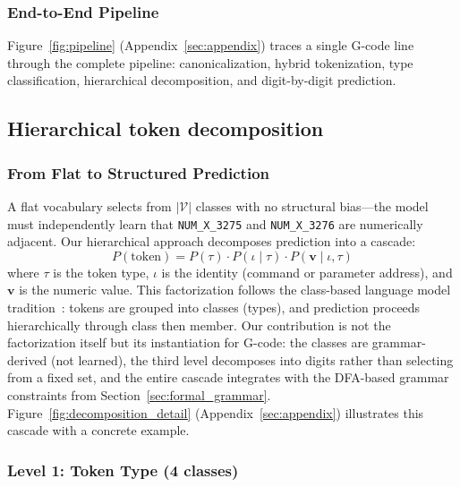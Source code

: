 \documentclass[11pt]{article}
\begin{document}
\subsubsection{End-to-End Pipeline}

Figure~\ref{fig:pipeline} (Appendix~\ref{sec:appendix}) traces a single G-code line through the complete pipeline: canonicalization, hybrid tokenization, type classification, hierarchical decomposition, and digit-by-digit prediction.

\subsection{Hierarchical token decomposition}
\label{sec:decomposition}

\subsubsection{From Flat to Structured Prediction}

A flat vocabulary selects from $|\mathcal{V}|$ classes with no structural bias---the model must independently learn that \texttt{NUM\_X\_3275} and \texttt{NUM\_X\_3276} are numerically adjacent. Our hierarchical approach decomposes prediction into a cascade:
\begin{equation}
    P(\text{token}) = P(\tau) \cdot P(\iota \mid \tau) \cdot P(\mathbf{v} \mid \iota, \tau)
\end{equation}
where $\tau$ is the token type, $\iota$ is the identity (command or parameter address), and $\mathbf{v}$ is the numeric value. This factorization follows the class-based language model tradition~\cite{brown_classlm,morin_hsoftmax}: tokens are grouped into classes (types), and prediction proceeds hierarchically through class then member. Our contribution is not the factorization itself but its instantiation for G-code: the classes are grammar-derived (not learned), the third level decomposes into digits rather than selecting from a fixed set, and the entire cascade integrates with the DFA-based grammar constraints from Section~\ref{sec:formal_grammar}. Figure~\ref{fig:decomposition_detail} (Appendix~\ref{sec:appendix}) illustrates this cascade with a concrete example.

\subsubsection{Level 1: Token Type (4 classes)}
\end{document}
